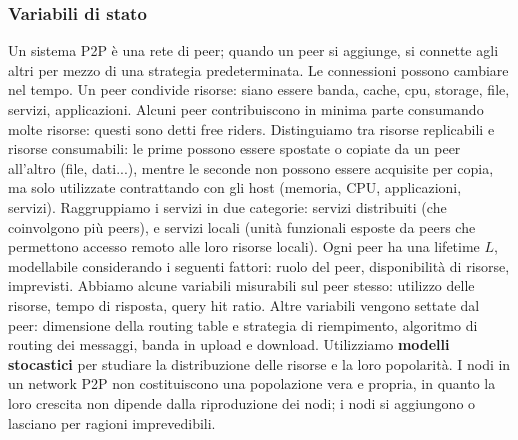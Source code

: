 \documentclass[11pt]{article}
\begin{document}
\subsubsection{Variabili di stato}
Un sistema P2P è una rete di peer; quando un peer si aggiunge, si connette agli altri per mezzo di una strategia predeterminata. Le connessioni possono cambiare nel tempo. Un peer condivide risorse: siano essere banda, cache, cpu, storage, file, servizi, applicazioni. Alcuni peer contribuiscono in minima parte consumando molte risorse: questi sono detti free riders. Distinguiamo tra risorse replicabili e risorse consumabili: le prime possono essere spostate o copiate da un peer all'altro (file, dati...), mentre le seconde non possono essere acquisite per copia, ma solo utilizzate contrattando con gli host (memoria, CPU, applicazioni, servizi). 
Raggruppiamo i servizi in due categorie: servizi distribuiti (che coinvolgono più peers), e servizi locali (unità funzionali esposte da peers che permettono accesso remoto alle loro risorse locali). 
Ogni peer ha una lifetime $L$, modellabile considerando i seguenti fattori: ruolo del peer, disponibilità di risorse, imprevisti. Abbiamo alcune variabili misurabili sul peer stesso: utilizzo delle risorse, tempo di risposta, query hit ratio. Altre variabili vengono settate dal peer: dimensione della routing table e strategia di riempimento, algoritmo di routing dei messaggi, banda in upload e download. 
Utilizziamo \textbf{modelli stocastici} per studiare la distribuzione delle risorse e la loro popolarità. 
I nodi in un network P2P non costituiscono una popolazione vera e propria, in quanto la loro crescita non dipende dalla riproduzione dei nodi; i nodi si aggiungono o lasciano per ragioni imprevedibili. 
\end{document}
